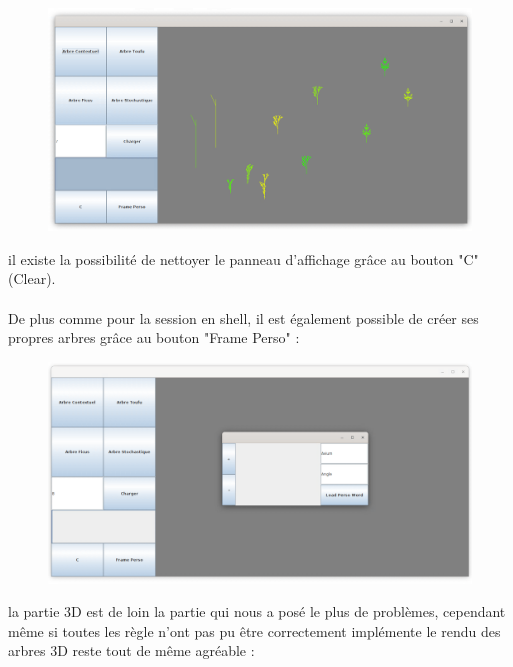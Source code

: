 \documentclass[a4paper,12pt]{article}
\begin{document}
\begin{figure}[h]
\centering
\includegraphics[scale=0.48]{Gameplay/2D_tree.png}
\end{figure}
il existe la possibilité de nettoyer le panneau d'affichage grâce au bouton "C" (Clear).
\\\\
De plus comme pour la session en shell, il est également possible de créer ses propres arbres grâce au bouton "Frame Perso" :
\begin{figure}[h]
\centering
\includegraphics[scale=0.48]{Gameplay/2D_tree_perso.png}
\end{figure}
la partie 3D est de loin la partie qui nous a posé le plus de problèmes, cependant même si toutes les règle n'ont pas pu être correctement implémente le rendu des arbres 3D reste tout de même agréable :
\end{document}
